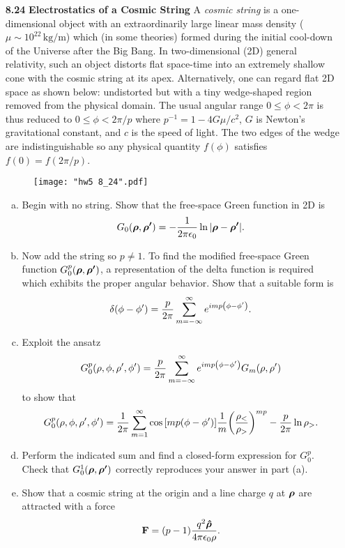 \documentclass{article}
\begin{document}
\begin{enumerate}
    \item [\textbf{8.24}] \textbf{Electrostatics of a Cosmic String } A \textit{cosmic string} is a one-dimensional object with an extraordinarily large linear mass density ($\mu \sim 10^{22}\,\si{\kg/\m}$) which (in some theories) formed during the initial cool-down of the Universe after the Big Bang. In two-dimensional (2D) general relativity, such an object distorts flat space-time into an extremely shallow cone with the cosmic string at its apex. Alternatively, one can regard flat 2D space as shown below: undistorted but with a tiny wedge-shaped region removed from the physical domain. The usual angular range $0\leq\phi < 2\pi$ is thus reduced to $0\leq\phi < 2\pi /p$ where $p^{-1} = 1 - 4G\mu/c^2$, $G$ is Newton's gravitational constant, and $c$ is the speed of light. The two edges of the wedge are indistinguishable so any physical quantity $f(\phi)$ satisfies $f(0) = f(2\pi /p)$.
    \begin{figure}[H]
    \centering
    \texttt{[image: "hw5 8\_24".pdf]}
    \end{figure}
    \begin{enumerate}[(a)]
        \item Begin with no string. Show that the free-space Green function in 2D is
        \[
            G_0(\vb*{\rho},\vb*{\rho'}) = -\frac{1}{2\pi\epsilon_0}\ln\abs{\vb*{\rho}-\vb*{\rho'}}.
        \]

        \item Now add the string so $p \neq 1$. To find the modified free-space Green function $G_0^p(\vb*{\rho},\vb*{\rho'})$, a representation of the delta function is required which exhibits the proper angular behavior. Show that a suitable form is
        \[
            \delta\pqty{\phi-\phi'} = \frac{p}{2\pi}\sum_{m=-\infty}^\infty e^{imp\pqty{\phi-\phi'}}.
        \]

        \item Exploit the ansatz
        \[
            G_0^p\pqty{\rho,\phi,\rho',\phi'} = \frac{p}{2\pi}\sum_{m=-\infty}^\infty e^{imp\pqty{\phi-\phi'}}G_m\pqty{\rho,\rho'}
        \]
        to show that
        \[
            G_0^p\pqty{\rho,\phi,\rho',\phi'} = \frac{1}{2\pi}\sum_{m=1}^\infty \cos\bqty{mp\pqty{\phi-\phi'}}\frac{1}{m}\pqty{\frac{\rho_<}{\rho_>}}^{mp} - \frac{p}{2\pi}\ln\rho_> .
        \]

        \item Perform the indicated sum and find a closed-form expression for $G_0^p$. Check that $G_0^1\pqty{\vb*{\rho},\vb*{\rho'}}$ correctly reproduces your answer in part (a).

        \item Show that a cosmic string at the origin and a line charge $q$ at $\vb*{\rho}$ are attracted with a force
        \[
            \vb{F} = (p-1)\frac{q^2\vu*{\rho}}{4\pi\epsilon_0\rho}.
        \]
    \end{enumerate}
\end{enumerate}
\end{document}
